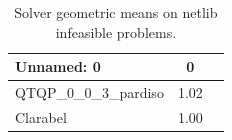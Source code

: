 \begin{table}
\caption{Solver geometric means on netlib infeasible problems.}
\label{t-netlib infeasible-geom_mean}
\begin{tabular}{lcc}
\toprule
Unnamed: 0 & 0 \\
\midrule
QTQP_0_0_3_pardiso & 1.02 \\
Clarabel & 1.00 \\
\bottomrule
\end{tabular}
\end{table}

